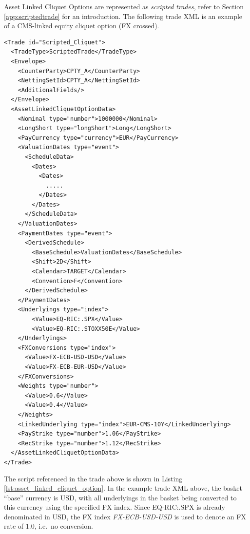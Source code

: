 Asset Linked Cliquet Options are represented as {\em scripted trades}, refer to Section
\ref{app:scriptedtrade} for an introduction. The following trade XML is an example of
a CMS-linked equity cliquet option (FX crossed).

\begin{verbatim}
<Trade id="Scripted_Cliquet">
  <TradeType>ScriptedTrade</TradeType>
  <Envelope>
    <CounterParty>CPTY_A</CounterParty>
    <NettingSetId>CPTY_A</NettingSetId>
    <AdditionalFields/>
  </Envelope>
  <AssetLinkedCliquetOptionData>
    <Nominal type="number">1000000</Nominal>
    <LongShort type="longShort">Long</LongShort>
    <PayCurrency type="currency">EUR</PayCurrency>
    <ValuationDates type="event">
      <ScheduleData>
        <Dates>
          <Dates>
            .....
          </Dates>
        </Dates>
      </ScheduleData>
    </ValuationDates>
    <PaymentDates type="event">
      <DerivedSchedule>
        <BaseSchedule>ValuationDates</BaseSchedule>
        <Shift>2D</Shift>
        <Calendar>TARGET</Calendar>
        <Convention>F</Convention>
      </DerivedSchedule>
    </PaymentDates>
    <Underlyings type="index">
        <Value>EQ-RIC:.SPX</Value>
        <Value>EQ-RIC:.STOXX50E</Value>
    </Underlyings>
    <FXConversions type="index">
      <Value>FX-ECB-USD-USD</Value>
      <Value>FX-ECB-EUR-USD</Value>
    </FXConversions>
    <Weights type="number">
      <Value>0.6</Value>
      <Value>0.4</Value>
    </Weights>
    <LinkedUnderlying type="index">EUR-CMS-10Y</LinkedUnderlying>
    <PayStrike type="number">1.06</PayStrike>
    <RecStrike type="number">1.12</RecStrike>
  </AssetLinkedCliquetOptionData>
</Trade>
\end{verbatim}

The script referenced in the trade above is shown in Listing
\ref{lst:asset_linked_cliquet_option}. In the example trade XML above, the basket ``base''
currency is USD, with all underlyings in the basket being converted to this currency
using the specified FX index. Since EQ-RIC:.SPX is already denominated in USD, the FX index \emph{FX-ECB-USD-USD} is used to denote an FX rate of 1.0, i.e.\ no conversion.

